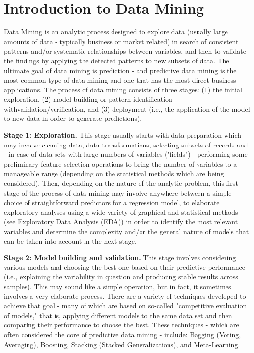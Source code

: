 \documentclass[a4paper,12pt]{article}
\begin{document}
\section{Introduction to Data Mining}


Data Mining is an analytic process designed to explore data (usually large amounts of data - typically business or market related) in search of consistent patterns and/or systematic relationships between variables, and then to validate the findings by applying the detected patterns to new subsets of data. The ultimate goal of data mining is prediction - and predictive data mining is the most common type of data mining and one that has the most direct business applications. The process of data mining consists of three stages: (1) the initial exploration, (2) model building or pattern identification withvalidation/verification, and (3) deployment (i.e., the application of the model to new data in order to generate predictions).


\textbf{Stage 1: Exploration.} This stage usually starts with data preparation which may involve cleaning data, data transformations, selecting subsets of records and - in case of data sets with large numbers of variables ("fields") - performing some preliminary feature selection operations to bring the number of variables to a manageable range (depending on the statistical methods which are being considered). Then, depending on the nature of the analytic problem, this first stage of the process of data mining may involve anywhere between a simple choice of straightforward predictors for a regression model, to elaborate exploratory analyses using a wide variety of graphical and statistical methods (see Exploratory Data Analysis (EDA)) in order to identify the most relevant variables and determine the complexity and/or the general nature of models that can be taken into account in the next stage.


\textbf{Stage 2: Model building and validation.} This stage involves considering various models and choosing the best one based on their predictive performance (i.e., explaining the variability in question and producing stable results across samples). This may sound like a simple operation, but in fact, it sometimes involves a very elaborate process. There are a variety of techniques developed to achieve that goal - many of which are based on so-called "competitive evaluation of models," that is, applying different models to the same data set and then comparing their performance to choose the best. These techniques - which are often considered the core of predictive data mining - include: Bagging (Voting, Averaging), Boosting, Stacking (Stacked Generalizations), and Meta-Learning.
\end{document}
